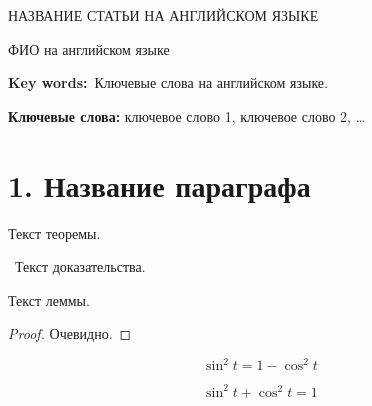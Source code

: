 
 \bigskip


 \begin{center}
 НАЗВАНИЕ СТАТЬИ НА АНГЛИЙСКОМ ЯЗЫКЕ
 \end{center}
 \begin{center}
  ФИО на английском языке
 \end{center}


\vspace*{-4pt}

{\noindent\footnotesize {\bf Key
 words:}~Ключевые слова на английском языке.\par}










{\noindent\footnotesize{\bf Ключевые
 слова:} ключевое слово 1, ключевое слово 2, \ldots\par}



\section*{1. Название параграфа}



Текст теоремы. \Endproc

\beginproof~Текст доказательства.~\endproof


Текст леммы.\Endproc




\begin{proof}
Очевидно.
\end{proof}

\begin{equation}
	\label{eq:aux}
	\sin^2 t = 1 - \cos^2 t
\end{equation}

\begin{equation}
	\label{eq:main}
	\sin^2 t + \cos^2 t = 1
\end{equation}








